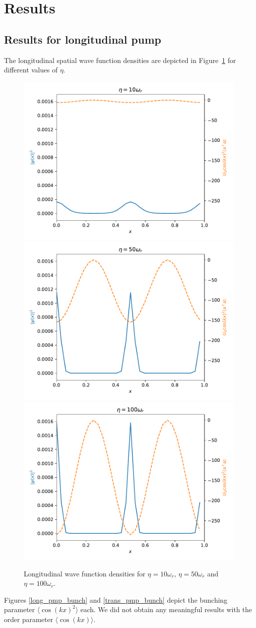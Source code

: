 \section{Results}

\subsection{Results for longitudinal pump}

The longitudinal spatial wave function densities are depicted in Figure~\ref{long_eta} for different values of $\eta$.

\begin{figure}[htp]
\centering
\includegraphics[width=.3\textwidth]{images/long_eta_10.pdf}\hfill
\includegraphics[width=.3\textwidth]{images/long_eta_50.pdf}\hfill
\includegraphics[width=.3\textwidth]{images/long_eta_100.pdf}
\caption{Longitudinal wave function densities for $\eta = 10 \omega_r$, $\eta = 50 \omega_r$ and $\eta = 100 \omega_r$.}
\label{long_eta}
\end{figure}
\FloatBarrier

\noindent Figures \ref{long_pmp_bunch} and \ref{trans_pmp_bunch} depict the bunching parameter $\langle \cos(kx)^2 \rangle$ each. We did not obtain any meaningful results with the order parameter $\langle \cos(kx) \rangle$.


